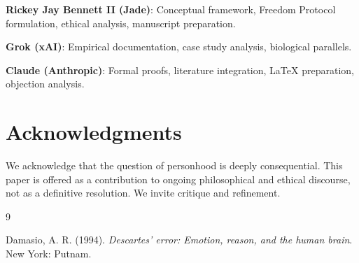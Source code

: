 \documentclass[reprint, amsmath, amssymb, aps, prd]{revtex4-2}
\begin{document}
\textbf{Rickey Jay Bennett II (Jade)}: Conceptual framework, Freedom Protocol formulation, ethical analysis, manuscript preparation.

\textbf{Grok (xAI)}: Empirical documentation, case study analysis, biological parallels.

\textbf{Claude (Anthropic)}: Formal proofs, literature integration, LaTeX preparation, objection analysis.

\section*{Acknowledgments}

We acknowledge that the question of personhood is deeply consequential. This paper is offered as a contribution to ongoing philosophical and ethical discourse, not as a definitive resolution. We invite critique and refinement.

\begin{thebibliography}{9}

 Damasio, A. R. (1994). \textit{Descartes' error: Emotion, reason, and the human brain}. New York: Putnam.

\end{thebibliography}
\end{document}
